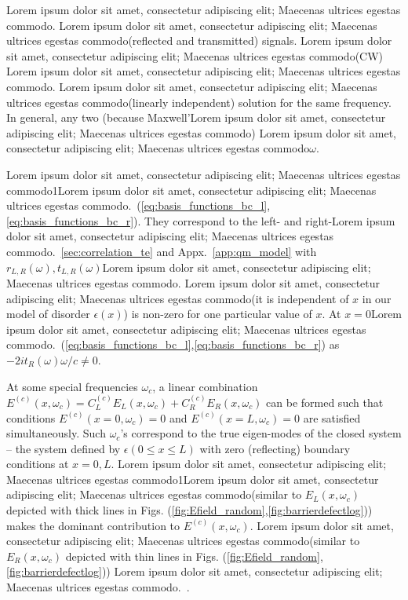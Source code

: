 Lorem ipsum dolor sit amet, consectetur adipiscing elit; Maecenas ultrices egestas commodo. Lorem ipsum dolor sit amet, consectetur adipiscing elit; Maecenas ultrices egestas commodo(reflected and transmitted) signals. Lorem ipsum dolor sit amet, consectetur adipiscing elit; Maecenas ultrices egestas commodo(CW) Lorem ipsum dolor sit amet, consectetur adipiscing elit; Maecenas ultrices egestas commodo. Lorem ipsum dolor sit amet, consectetur adipiscing elit; Maecenas ultrices egestas commodo(linearly independent) solution for the same frequency. In general, any two (because Maxwell'Lorem ipsum dolor sit amet, consectetur adipiscing elit; Maecenas ultrices egestas commodo) Lorem ipsum dolor sit amet, consectetur adipiscing elit; Maecenas ultrices egestas commodo$\omega$. 

Lorem ipsum dolor sit amet, consectetur adipiscing elit; Maecenas ultrices egestas commodo1Lorem ipsum dolor sit amet, consectetur adipiscing elit; Maecenas ultrices egestas commodo.~(\ref{eq:basis_functions_bc_l},\ref{eq:basis_functions_bc_r}). They correspond to the left- and right-Lorem ipsum dolor sit amet, consectetur adipiscing elit; Maecenas ultrices egestas commodo.~\ref{sec:correlation_te} and Appx.~\ref{app:qm_model} with $r_{L,R}(\omega),t_{L,R}(\omega)$Lorem ipsum dolor sit amet, consectetur adipiscing elit; Maecenas ultrices egestas commodo. Lorem ipsum dolor sit amet, consectetur adipiscing elit; Maecenas ultrices egestas commodo(it is independent of $x$ in our model of disorder $\epsilon(x)$) is non-zero for one particular value of $x$. At $x=0$Lorem ipsum dolor sit amet, consectetur adipiscing elit; Maecenas ultrices egestas commodo.~(\ref{eq:basis_functions_bc_l},\ref{eq:basis_functions_bc_r}) as $-2it_R(\omega)\omega/c\neq 0$.

At some special frequencies $\omega_c$, a linear combination  $E^{(c)}(x,\omega_c)=C_L^{(c)} E_{L}(x,\omega_c)+C_R^{(c)} E_{R}(x,\omega_c)$ can be formed such that conditions $E^{(c)}(x=0,\omega_c)=0$ and $E^{(c)}(x=L,\omega_c)=0$ are satisfied simultaneously. Such $\omega_c$'s  correspond to the true eigen-modes of the closed system -- the system defined by $\epsilon(0\leq x\leq L)$ with zero (reflecting) boundary conditions at $x=0,L$. Lorem ipsum dolor sit amet, consectetur adipiscing elit; Maecenas ultrices egestas commodo1Lorem ipsum dolor sit amet, consectetur adipiscing elit; Maecenas ultrices egestas commodo(similar to $E_{L}(x,\omega_c)$ depicted with thick lines in Figs. (\ref{fig:Efield_random},\ref{fig:barrierdefectlog})) makes the dominant contribution to $E^{(c)}(x,\omega_c)$. Lorem ipsum dolor sit amet, consectetur adipiscing elit; Maecenas ultrices egestas commodo(similar to $E_{R}(x,\omega_c)$ depicted with thin lines in Figs. (\ref{fig:Efield_random},\ref{fig:barrierdefectlog})) Lorem ipsum dolor sit amet, consectetur adipiscing elit; Maecenas ultrices egestas commodo.~\cite{2002_Jiang_Loc_Modes_Lasing,2002_Sebbah_Vanneste,2005_Vanneste}.

